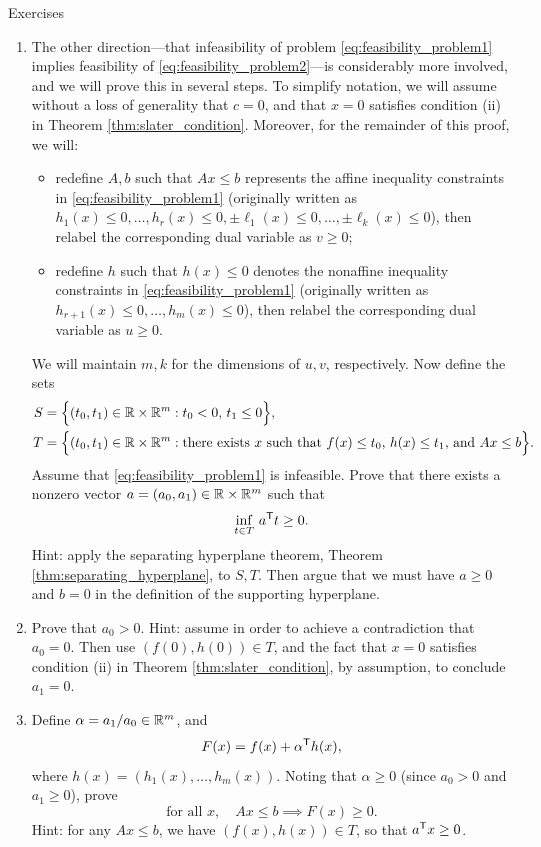 \begin{xcb}{Exercises}
\begin{enumerate}[label=\thechapter.\arabic*]
\begin{enumerate}[label=\alph*.]
\item The other direction---that infeasibility of problem
  \eqref{eq:feasibility_problem1} implies feasibility of
  \eqref{eq:feasibility_problem2}---is considerably more involved, and we will
  prove this in several steps. To simplify notation, we will assume without a
  loss of generality that $c = 0$, and that $x = 0$ satisfies condition (ii) in
  Theorem \ref{thm:slater_condition}. Moreover, for the remainder of this proof,
  we will:    
  \begin{itemize}  
  \item redefine $A,b$ such that $Ax \leq b$ represents the affine inequality
    constraints in \eqref{eq:feasibility_problem1} (originally written as
    $h_1(x) \leq 0, \dots, h_r(x) \leq 0, \pm\ell_1(x) \leq 0, \dots,
    \pm\ell_k(x) \leq 0$), then relabel the corresponding dual variable as $v
    \geq 0$; 
  \item redefine $h$ such that $h(x) \leq 0$ denotes the nonaffine inequality
    constraints in \eqref{eq:feasibility_problem1} (originally written as
    $h_{r+1}(x) \leq 0, \dots, h_m(x) \leq 0$), then relabel the corresponding
    dual variable as $u \geq 0$.
  \end{itemize}
  We will maintain $m,k$ for the dimensions of $u,v$, respectively. Now define
  the sets     
  \begin{align*}
  S &= \Big\{ (t_0, t_1) \in \mathbb{R} \times \mathbb{R}^m : t_0 < 0, \, t_1 \leq 0 \Big\}, \\  
  T &= \Big\{ (t_0, t_1) \in \mathbb{R} \times \mathbb{R}^m : \text{there exists $x$ such that
      $f(x) \leq t_0$, $h(x) \leq t_1$, and $Ax \leq b$} \Big\}. 
  \end{align*}
  Assume that \eqref{eq:feasibility_problem1} is infeasible. Prove that there
  exists a nonzero vector $a = (a_0, a_1) \in \mathbb{R} \times \mathbb{R}^m$ such that 
  \[
  \inf_{t \in T} \, a^{\mathsf{T}} t \geq 0.  
  \]
  Hint: apply the separating hyperplane theorem, Theorem
  \ref{thm:separating_hyperplane}, to $S,T$. Then argue that we must have $a
  \geq 0$ and $b = 0$ in the definition of the supporting hyperplane. 

\item Prove that $a_0 > 0$. Hint: assume in order to achieve a contradiction 
  that $a_0 = 0$. Then use $(f(0), h(0)) \in T$, and the fact that $x = 0$
  satisfies condition (ii) in Theorem \ref{thm:slater_condition}, by assumption,
  to conclude $a_1 = 0$.
\item Define $\alpha = a_1 / a_0 \in \mathbb{R}^m$, and  
  \[
  F(x) = f(x) + \alpha^{\mathsf{T}} h(x),
  \]
  where $h(x) = (h_1(x), \dots, h_m(x))$. Noting that $\alpha \geq 0$ (since
  $a_0 > 0$ and $a_1 \geq 0$), prove
  \[
 \text{for all $x$}, \quad Ax \leq b \implies F(x) \geq 0.
  \]
  Hint: for any $Ax \leq b$, we have $(f(x), h(x)) \in T$, so that $a^{\mathsf{T}} x \geq
  0$.


\end{enumerate}
\end{enumerate}
\end{xcb}
